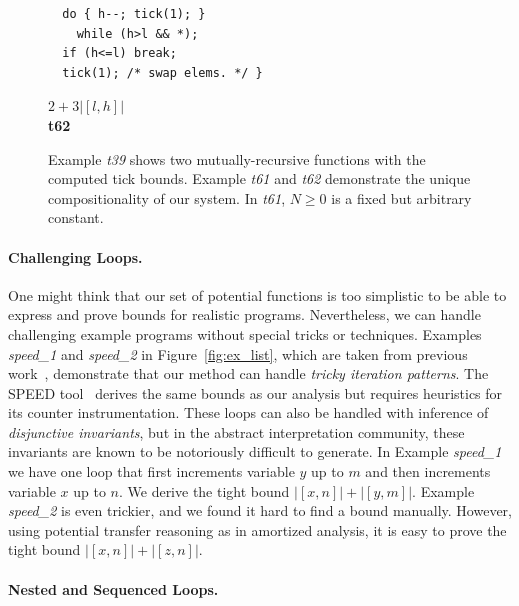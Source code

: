 \documentclass{sigplanconf}
\newcommand{\ifshort}[2]{\ifx\fullversion\undefined{#1}\else{#2}\fi}
\newcommand{\paraskip}[0]{\ifshort{\vspace{-4pt}}{}}
\begin{document}
\begin{figure}
\begin{minipage}[b]{5.5cm}
\begin{center}
\begin{lstlisting}
  do { h--; tick(1); }
    while (h>l && *);
  if (h<=l) break;
  tick(1); /* swap elems. */ }
\end{lstlisting}
$2+3|[l,h]|$
\\[.4\baselineskip]
      {\bf t62}
    \end{center}
  \end{minipage}
\vspace{1ex}
\caption{Example \emph{t39} shows two mutually-recursive functions
  with the computed tick bounds.  Example \emph{t61} and \emph{t62}
  demonstrate the unique compositionality of our system. In \emph{t61},
  $N\geq 0$ is a fixed but arbitrary constant. %
  }
  \label{fig:ex_list_2}
\end{figure}



\paraskip
\paragraph{Challenging Loops.}

One might think that our set of potential functions is too simplistic
to be able to express and prove bounds for realistic
programs. Nevertheless, we can handle challenging example programs
without special tricks or techniques.  Examples \emph{speed\_1} and
\emph{speed\_2} in Figure~\ref{fig:ex_list}, which are taken from previous work~\cite{GulwaniMC09},
demonstrate that our method can handle \emph{tricky iteration
  patterns}.  The SPEED tool~\cite{GulwaniMC09} derives the same
bounds as our analysis but requires heuristics for its counter
instrumentation.  These loops can also be handled with inference of
\emph{disjunctive invariants}, but in the abstract interpretation
community, these invariants are known to be notoriously difficult to
generate.
%
In Example \emph{speed\_1} we have one loop that first increments
variable $y$ up to $m$ and then increments variable $x$ up to $n$.  We
derive the tight bound $|[x, n]| + |[y, m]|$.
%
Example \emph{speed\_2} is even trickier, and we found it hard to
find a bound manually.  However, using potential transfer reasoning as
in amortized analysis, it is easy to prove the tight bound
$|[x, n]| + |[z, n]|$.

\paraskip
\paragraph{Nested and Sequenced Loops.}
\end{document}
